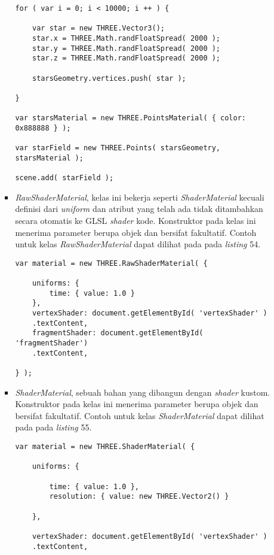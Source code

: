 \documentclass[a4paper,twoside]{article}
\begin{document}
\begin{enumerate}
\begin{itemize}
\begin{itemize}
\begin{lstlisting}[caption={Contoh penggunaan kelas {\it PointsMaterial}.},captionpos=b]
for ( var i = 0; i < 10000; i ++ ) {

	var star = new THREE.Vector3();
	star.x = THREE.Math.randFloatSpread( 2000 );
	star.y = THREE.Math.randFloatSpread( 2000 );
	star.z = THREE.Math.randFloatSpread( 2000 );

	starsGeometry.vertices.push( star );

}

var starsMaterial = new THREE.PointsMaterial( { color: 0x888888 } );

var starField = new THREE.Points( starsGeometry, starsMaterial );

scene.add( starField );
\end{lstlisting}

	\item {\it RawShaderMaterial}, kelas ini bekerja seperti {\it ShaderMaterial} kecuali definisi dari {\it uniform} dan atribut yang telah ada tidak ditambahkan secara otomatis ke GLSL {\it shader} kode. Konstruktor pada kelas ini menerima parameter berupa objek dan bersifat fakultatif. Contoh untuk kelas {\it RawShaderMaterial} dapat dilihat pada pada {\it listing} 54.
	
\begin{lstlisting}[caption={Contoh penggunaan kelas {\it RawShaderMaterial}.},captionpos=b]
var material = new THREE.RawShaderMaterial( {

    uniforms: {
        time: { value: 1.0 }
    },
    vertexShader: document.getElementById( 'vertexShader' )
    .textContent,
    fragmentShader: document.getElementById( 'fragmentShader')
    .textContent,

} );
\end{lstlisting}

	\item {\it ShaderMaterial}, sebuah bahan yang dibangun dengan {\it shader} kustom. Konstruktor pada kelas ini menerima parameter berupa objek dan bersifat fakultatif. Contoh untuk kelas {\it ShaderMaterial} dapat dilihat pada pada {\it listing} 55.
	
\begin{lstlisting}[caption={Contoh penggunaan kelas {\it ShaderMaterial}.},captionpos=b]
var material = new THREE.ShaderMaterial( {

	uniforms: {

		time: { value: 1.0 },
		resolution: { value: new THREE.Vector2() }

	},

	vertexShader: document.getElementById( 'vertexShader' )
	.textContent,


\end{lstlisting}
\end{itemize}
\end{itemize}
\end{enumerate}
\end{document}
